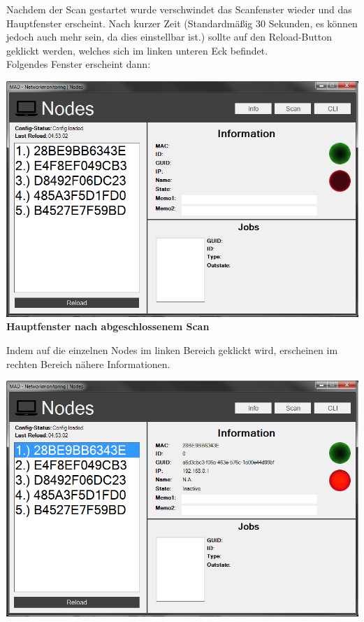 \documentclass[12pt,a4paper]{report}
\begin{document}
\begin{onehalfspace}
\begin{itemize}
\end{itemize}
Nachdem der Scan gestartet wurde verschwindet das Scanfenster wieder und das Hauptfenster erscheint. Nach kurzer Zeit (Standardmäßig 30 Sekunden, es können jedoch auch mehr sein, da dies einstellbar ist.) sollte auf den Reload-Button geklickt werden, welches sich im linken unteren Eck befindet. \\Folgendes Fenster erscheint dann:
\begin{center}
\includegraphics[scale=0.7]{../docs/lyaton/graphics/GUI_v3_reload.png}\\
\textbf{Hauptfenster nach abgeschlossenem Scan}
\end{center}
Indem auf die einzelnen Nodes im linken Bereich geklickt wird, erscheinen im rechten Bereich nähere Informationen.
\begin{center}
\includegraphics[scale=0.7]{../docs/lyaton/graphics/GUI_v3_nodeclick.png}\\

\end{center}
\end{onehalfspace}
\end{document}
